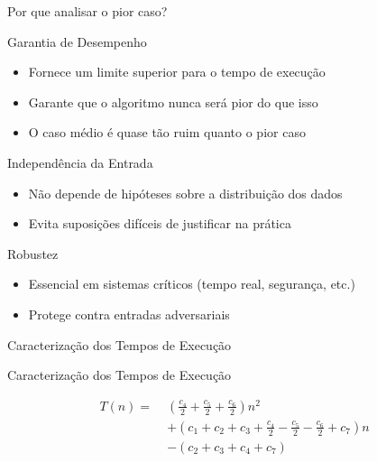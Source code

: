 \documentclass{beamer}
\newcommand{\og}[1]{\textcolor{rsOrange}{#1}}
\begin{document}
\begin{frame}{Por que analisar o pior caso?}

\begin{block}{Garantia de Desempenho}
\begin{itemize}
    \item Fornece um limite superior para o tempo de execução
    \item Garante que o algoritmo nunca será pior do que isso
    \item \og{O caso médio é quase tão ruim quanto o pior caso}
\end{itemize}
\end{block}

\vspace{0.2cm}

\begin{block}{Independência da Entrada}
\begin{itemize}
    \item Não depende de hipóteses sobre a distribuição dos dados
    \item Evita suposições difíceis de justificar na prática
\end{itemize}
\end{block}

\vspace{0.2cm}

\begin{block}{Robustez}
\begin{itemize}
    \item Essencial em sistemas críticos (tempo real, segurança, etc.)
    \item Protege contra entradas adversariais
\end{itemize}
\end{block}


\end{frame}
\begin{frame}

\centering
\Huge
Caracterização dos Tempos de Execução

\end{frame}
\begin{frame}{Caracterização dos Tempos de Execução}

\begin{align*}
T(n) = \;& \left (\frac{c_4}{2}+\frac{c_5}{2}+\frac{c_6}{2} \right ) n^2 \\
        & + \left (c_1 +c_2 + c_3 + \frac{c_4}{2}-\frac{c_5}{2}-\frac{c_6}{2} + c_7 \right )n\\
        & - (c_2 + c_3 + c_4 +c_7)
\end{align*}

\end{frame}
\end{document}
